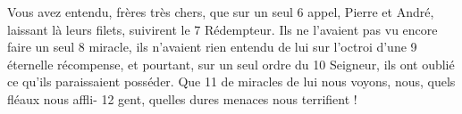 Vous avez entendu, frères très chers, que sur un seul	 
6	 	appel, Pierre et André, laissant là leurs filets, suivirent le	 
7	 	Rédempteur. Ils ne l'avaient pas vu encore faire un seul	 
8	 	miracle, ils n'avaient rien entendu de lui sur l'octroi d'une	 
9	 	éternelle récompense, et pourtant, sur un seul ordre du	 
10	 	Seigneur, ils ont oublié ce qu'ils paraissaient posséder. Que	 
11	 	de miracles de lui nous voyons, nous, quels fléaux nous affli-	 
12	 	gent, quelles dures menaces nous terrifient !